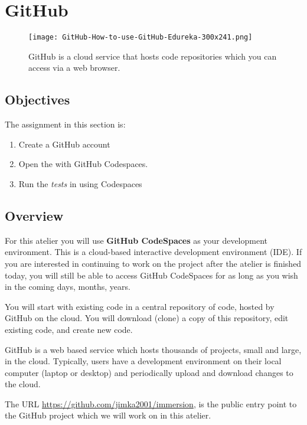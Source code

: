 \section{GitHub}
\label{sec.github}


\begin{figure}[h]
  \centering
  \texttt{[image: GitHub-How-to-use-GitHub-Edureka-300x241.png]}
  \caption{GitHub is a cloud service that hosts code repositories which 
    you can access via a web browser.}
\end{figure}

\subsection{Objectives}
The assignment in this section is:
\begin{enumerate}
\item Create a GitHub account
\item Open the  with GitHub Codespaces.
\item Run the \emph{tests}  in using Codespaces
\end{enumerate}

\subsection{Overview}

For this atelier you will use \textbf{GitHub CodeSpaces} as your
development environment.  This is a cloud-based interactive
development environment (IDE).  If you are interested in continuing to
work on the project after the atelier is finished today, you will
still be able to access GitHub CodeSpaces for as long as you wish in
the coming days, months, years.



You will start with existing code in a central repository of code, hosted by
GitHub on the cloud.  You will download (clone) a copy of this
repository, edit existing code, and create new code.

GitHub is a web based service which hosts thousands of projects, small
and large, in the cloud.  Typically, users have a development
environment on their local computer (laptop or desktop) and
periodically upload and download changes to the cloud.

The URL \url{https://github.com/jimka2001/immersion}, is the public
entry point to the GitHub project which we will work on in this
atelier.

